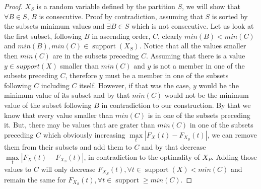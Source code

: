 \documentclass[review]{elsarticle}
\DeclareMathOperator{\support}{support}
\begin{document}
\begin{proof}
$X_S$ is a random variable defined by the partition $S$, we will show that $\forall B\in S$, $B$ is consecutive.
Proof by contradiction, assuming that $S$ is sorted by the subsets minimum values and $\exists B \in S $ which is not consecutive. Let us look at the first subset, following $B$ in ascending order, $C$, clearly $min(B)<min(C)$ and $min(B),min(C) \in \support(X_S)$. Notice that all the values smaller then $min(C)$ are in the subsets preceding $C$. Assuming that there is a value $y\in support(X)$ smaller than $min(C)$ and $y$ is not a member in one of the subsets preceding $C$, therefore $y$ must be a member in one of the subsets following $C$ including $C$ itself. However, if that was the case, $y$ would be the minimum value of its subset and by that $min(C)$ would not be the minimum value of the subset following $B$ in contradiction to our construction. By that we know that every value smaller than $min(C)$ is in one of the subsets preceding it. But, there may be values that are grater than $min(C)$ in one of the subsets preceding $C$ which obviously increasing $\max\limits_{t}|F_{X}(t)-F_{X_S}(t)|$, we can remove them from their subsets and add them to $C$ and by that decrease $\max\limits_{t}|F_{X}(t)-F_{X_S}(t)|$, in contradiction to the optimality of $X_P$. Adding those values to $C$ will only decrease $F_{X_S}(t), \forall t\in \support(X)<min(C)$ and remain the same for $F_{X_S}(t), \forall t \in \support\geq min(C)$.
\end{proof}

\end{document}
